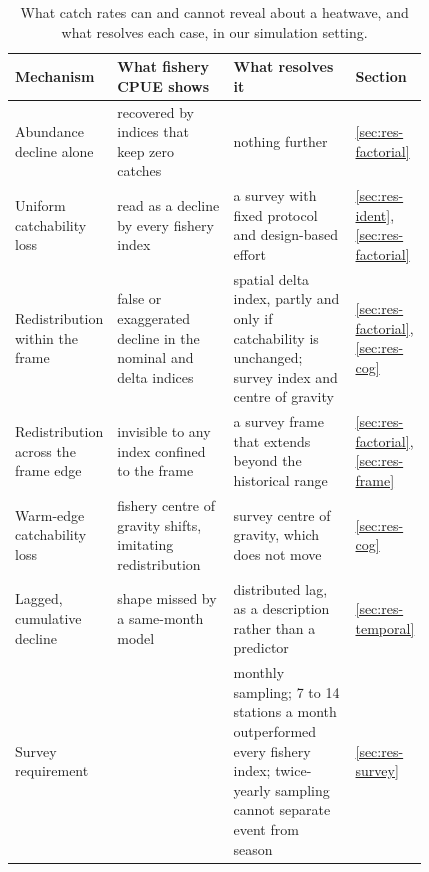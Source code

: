 \documentclass[11pt,a4paper]{article}
\begin{document}
\begin{table}[tbp]
\centering\footnotesize
\caption{What catch rates can and cannot reveal about a heatwave, and what resolves each case, in our simulation setting.}
\label{tab:synthesis}
\begin{tabular}{@{}>{\raggedright\arraybackslash}p{0.2\linewidth}>{\raggedright\arraybackslash}p{0.3\linewidth}>{\raggedright\arraybackslash}p{0.32\linewidth}l@{}}
\toprule
Mechanism & What fishery CPUE shows & What resolves it & Section \\
\midrule
Abundance decline alone & recovered by indices that keep zero catches & nothing further & \ref{sec:res-factorial} \\
Uniform catchability loss & read as a decline by every fishery index & a survey with fixed protocol and design-based effort & \ref{sec:res-ident}, \ref{sec:res-factorial} \\
Redistribution within the frame & false or exaggerated decline in the nominal and delta indices & spatial delta index, partly and only if catchability is unchanged; survey index and centre of gravity & \ref{sec:res-factorial}, \ref{sec:res-cog} \\
Redistribution across the frame edge & invisible to any index confined to the frame & a survey frame that extends beyond the historical range & \ref{sec:res-factorial}, \ref{sec:res-frame} \\
Warm-edge catchability loss & fishery centre of gravity shifts, imitating redistribution & survey centre of gravity, which does not move & \ref{sec:res-cog} \\
Lagged, cumulative decline & shape missed by a same-month model & distributed lag, as a description rather than a predictor & \ref{sec:res-temporal} \\
Survey requirement & & monthly sampling; 7 to 14 stations a month outperformed every fishery index; twice-yearly sampling cannot separate event from season & \ref{sec:res-survey} \\
\bottomrule
\end{tabular}
\end{table}
\end{document}
